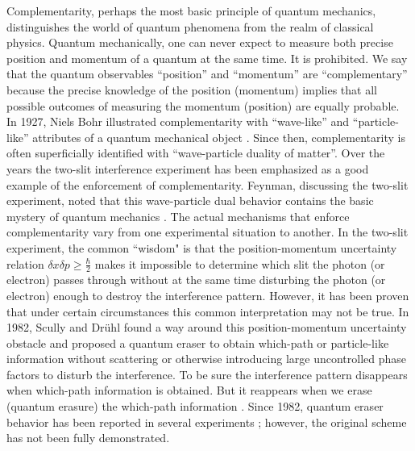 \documentclass[pra,aps,epsf,12pt]{revtex4-2}
\begin{document}
Complementarity, perhaps the most basic principle of quantum mechanics, distinguishes the
world of quantum phenomena from the realm of classical physics. Quantum mechanically, one
can never expect to measure both precise position and momentum of a quantum at the same
time. It is prohibited. We say that the quantum observables ``position'' and ``momentum''
are ``complementary'' because the precise knowledge of the position (momentum) implies
that all possible outcomes of measuring the momentum (position) are equally probable. In
1927, Niels Bohr illustrated complementarity with ``wave-like'' and ``particle-like''
attributes of a quantum mechanical object \cite{Bohr}. Since then, complementarity is
often superficially identified with ``wave-particle duality of matter''. Over the years
the two-slit interference experiment has been emphasized as a good example of the
enforcement of complementarity. Feynman, discussing the two-slit experiment, noted that
this wave-particle dual behavior contains the basic mystery of quantum mechanics
\cite{Feynman}. The actual mechanisms that enforce complementarity vary from one
experimental situation to another. In the two-slit experiment, the common ``wisdom" is
that the position-momentum uncertainty relation $\delta x\delta p\geq \frac{\hbar }{2}$
makes it impossible to determine which slit the photon (or electron) passes through
without at the same time disturbing the photon (or electron) enough to destroy the
interference pattern. However, it has been proven \cite {Scully} that under certain
circumstances this common interpretation may not be true. In 1982, Scully and Dr\"{u}hl
found a way around this position-momentum uncertainty obstacle and proposed a quantum
eraser to obtain which-path or particle-like information without scattering or
otherwise introducing large uncontrolled phase factors to disturb the
interference. To be sure the interference pattern disappears when which-path information
is obtained. But it reappears when we erase (quantum erasure) the which-path information
\cite{Scully,Wheeler}. Since 1982, quantum eraser behavior has been reported in several
experiments \cite{History}; however, the original scheme has not been fully demonstrated.
\end{document}
